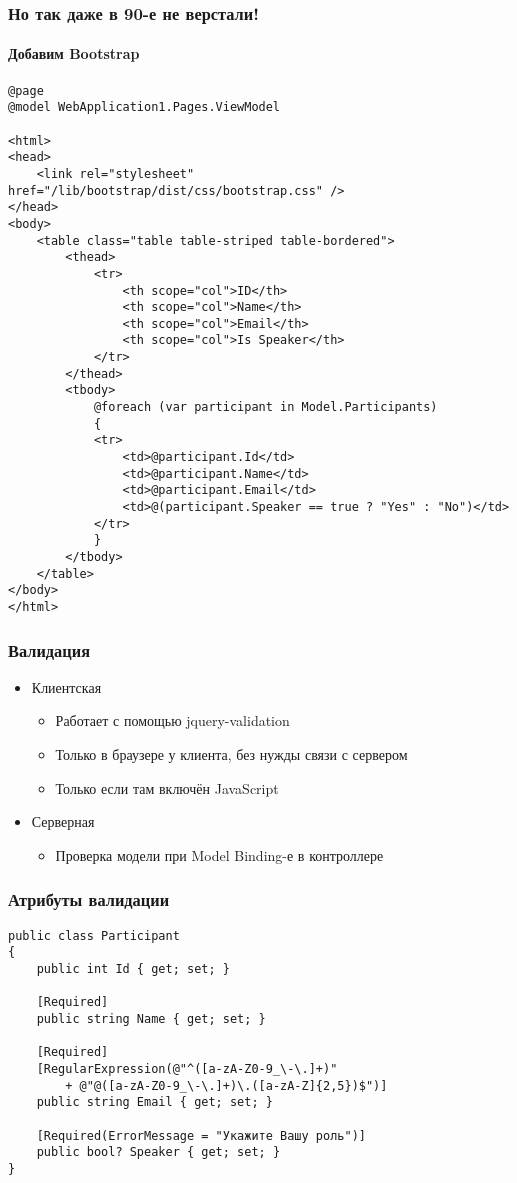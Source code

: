 \documentclass[xetex,mathserif,serif]{beamer}
\begin{document}
	\begin{frame}[fragile]
		\frametitle{Но так даже в 90-е не верстали!}
		\framesubtitle{Добавим Bootstrap}
		\begin{tiny}
			\begin{verbatim}
@page
@model WebApplication1.Pages.ViewModel

<html>
<head>
    <link rel="stylesheet" href="/lib/bootstrap/dist/css/bootstrap.css" />
</head>
<body>
    <table class="table table-striped table-bordered">
        <thead>
            <tr>
                <th scope="col">ID</th>
                <th scope="col">Name</th>
                <th scope="col">Email</th>
                <th scope="col">Is Speaker</th>
            </tr>
        </thead>
        <tbody>
            @foreach (var participant in Model.Participants)
            {
            <tr>
                <td>@participant.Id</td>
                <td>@participant.Name</td>
                <td>@participant.Email</td>
                <td>@(participant.Speaker == true ? "Yes" : "No")</td>
            </tr>
            }
        </tbody>
    </table>
</body>
</html>
			\end{verbatim}
		\end{tiny}
	\end{frame}

	\begin{frame}
		\frametitle{Валидация}
		\begin{itemize}
			\item Клиентская
			\begin{itemize}
				\item Работает с помощью jquery-validation
				\item Только в браузере у клиента, без нужды связи с сервером
				\item Только если там включён JavaScript
			\end{itemize}
			\item Серверная
			\begin{itemize}
				\item Проверка модели при Model Binding-е в контроллере
			\end{itemize}
		\end{itemize}
	\end{frame}

	\begin{frame}[fragile]
		\frametitle{Атрибуты валидации}
		\begin{scriptsize}
			\begin{verbatim}
public class Participant
{
    public int Id { get; set; }

    [Required]
    public string Name { get; set; }

    [Required]
    [RegularExpression(@"^([a-zA-Z0-9_\-\.]+)"
        + @"@([a-zA-Z0-9_\-\.]+)\.([a-zA-Z]{2,5})$")]
    public string Email { get; set; }

    [Required(ErrorMessage = "Укажите Вашу роль")]
    public bool? Speaker { get; set; }
}
			\end{verbatim}
		\end{scriptsize}
	\end{frame}
\end{document}
